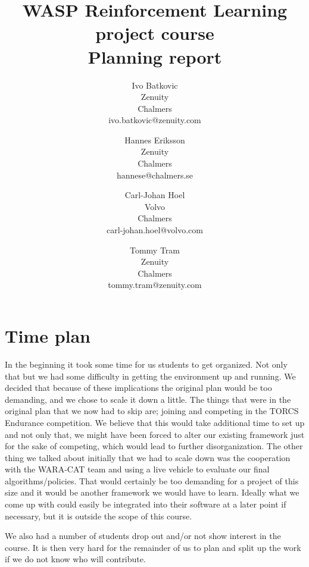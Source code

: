\documentclass{article}
\begin{document}
\title{WASP Reinforcement Learning project course \\
		Planning report}
\author{
	Ivo Batkovic\\
	Zenuity\\
	Chalmers\\
	ivo.batkovic@zenuity.com
	\and
	Hannes Eriksson\\
	Zenuity\\
	Chalmers\\
	hannese@chalmers.se
	\and
	Carl-Johan Hoel\\
	Volvo\\
	Chalmers\\
	carl-johan.hoel@volvo.com
	\and
	Tommy Tram\\
	Zenuity\\
	Chalmers\\
	tommy.tram@zenuity.com
}

\maketitle
\thispagestyle{empty}
\clearpage
\section{Time plan}

In the beginning it took some time for us students to get organized. Not only that but we had some difficulty in getting the environment up and running. We decided that because of these implications the original plan would be too demanding, and we chose to scale it down a little. The things that were in the original plan that we now had to skip are; joining and competing in the TORCS Endurance competition. We believe that this would take additional time to set up and not only that, we might have been forced to alter our existing framework just for the sake of competing, which would lead to further disorganization. The other thing we talked about initially that we had to scale down was the cooperation with the WARA-CAT team and using a live vehicle to evaluate our final algorithms/policies. That would certainly be too demanding for a project of this size and it would be another framework we would have to learn.
Ideally what we come up with could easily be integrated into their software at a later point if necessary, but it is outside the scope of this course.

We also had a number of students drop out and/or not show interest in the course. It is then very hard for the remainder of us to plan and split up the work if we do not know who will contribute. 
\end{document}
